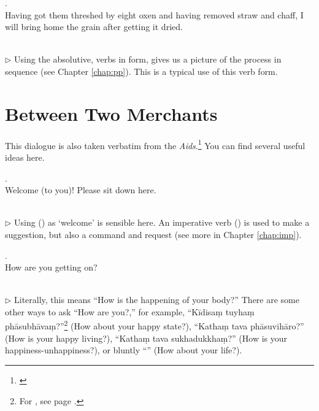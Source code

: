 \medskip
\parbox[lt]{0.93\linewidth}{\raggedright{}. \\
\hspace*{6mm}Having got them threshed by eight oxen and having removed straw and chaff, I will bring home the grain after getting it dried.}\\[1mm]
{\small $\triangleright$ Using the absolutive, verbs in  form, gives us a picture of the process in sequence (see Chapter \ref{chap:pp}). This is a typical use of this verb form.}

{}
\section*{Between Two Merchants}

This dialogue is also taken verbatim from the \emph{Aids}.\footnote{\citealp[pp.~56--8]{buddhadatta:aids}} You can find several useful ideas here.

\medskip
\parbox[lt]{0.93\linewidth}{\raggedright{}. \\
\hspace*{6mm}Welcome (to you)! Please sit down here.}\\[1mm]
{\small $\triangleright$ Using  () as `welcome' is sensible here. An imperative verb () is used to make a suggestion, but also a command and request (see more in Chapter \ref{chap:imp}).}

\medskip
\parbox[lt]{0.93\linewidth}{\raggedright{}. \\
\hspace*{6mm}How are you getting on?}\\[1mm]
{\small $\triangleright$ Literally, this means ``How is the happening of your body?'' There are some other ways to ask ``How are you?,'' for example, ``K\=idisa\d m tuyha\d m ph\=asubh\=ava\d m?''\footnote{For , see page \pageref{pacck1:kvi}.} (How about your happy state?), ``Katha\d m tava ph\=asuvih\=aro?'' (How is your happy living?), ``Katha\d m tava sukhadukkha\d m?'' (How is your happiness-unhappiness?), or bluntly ``'' (How about your life?).}

